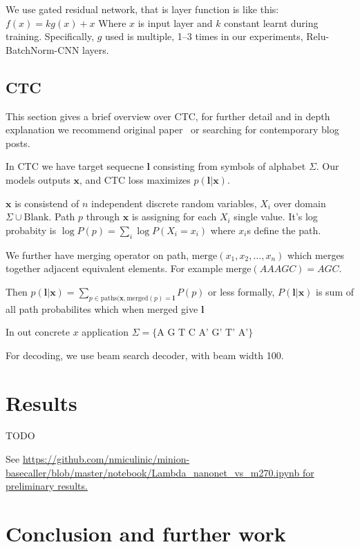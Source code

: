\documentclass[times, utf8, seminar, numeric]{fer}
\begin{document}
We use gated residual network, that is layer function is like this: $f(x) = k g(x) + x$ Where $x$ is input layer and $k$ constant learnt during training. Specifically, $g$ used is multiple, 1--3 times in our experiments, Relu-BatchNorm-CNN layers.

\section{CTC}

This section gives a brief overview over CTC, for further detail and in depth explanation we recommend original paper~\cite{graves2006connectionist} or searching for contemporary blog posts.

In CTC we have target sequecne $\mathbf{l}$ consisting from symbols of alphabet $\Sigma$. Our models outputs $\mathbf{x}$, and CTC loss maximizes $p(\mathbf{l}|\mathbf{x})$.

$\mathbf{x}$ is consistend of $n$ independent discrete random variables, $X_i$  over domain $\Sigma \cup \text{Blank}$. Path $p$ through $\mathbf{x}$ is assigning for each $X_i$ single value. It's log probabity is $\log P(p) = \sum_i {\log P(X_i=x_i)}$ where $x_i$s define the path.

We further have merging operator on path, $\text{merge}(x_1, x_2, \ldots, x_n)$ which merges together adjacent equivalent elements. For example $\text{merge}(AAAGC) = AGC$.

Then $p(\mathbf{l}|\mathbf{x}) = \sum_{p\in\text{paths}(\mathbf{x}, \text{merged}(p) = \mathbf{l}}{P(p)}$ or less formally, $P(\mathbf{l}|\mathbf{x})$ is sum of all path probabilites which when merged give $\mathbf{l}$

In out concrete $x$ application $\Sigma = \{\text{A G T C A' G' T' A'}\}$

For decoding, we use beam search decoder, with beam width 100.

\chapter{Results}

TODO

See \url{https://github.com/nmiculinic/minion-basecaller/blob/master/notebook/Lambda_nanonet_vs_m270.ipynb for preliminary results.}

\chapter{Conclusion and further work}
\end{document}
